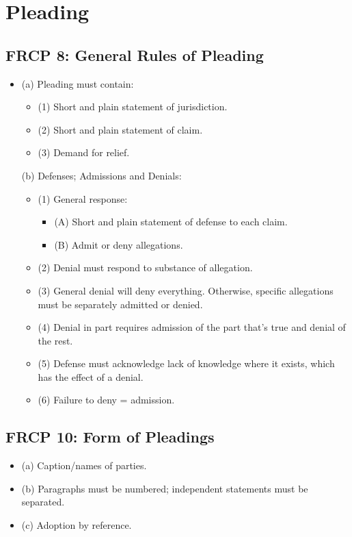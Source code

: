 \section{Pleading}

\subsection{FRCP 8: General Rules of Pleading}

\begin{itemize}
    \item (a) Pleading must contain:
    \begin{itemize}
        \item (1) Short and plain statement of jurisdiction.
        \item (2) Short and plain statement of claim.
        \item (3) Demand for relief.
    \end{itemize}
    (b) Defenses; Admissions and Denials:
    \begin{itemize}
        \item (1) General response:
        \begin{itemize}
            \item (A) Short and plain statement of defense to each claim.
            \item (B) Admit or deny allegations.
        \end{itemize}
        \item (2) Denial must respond to substance of allegation.
        \item (3) General denial will deny everything. Otherwise, specific 
        allegations must be separately admitted or denied.
        \item (4) Denial in part requires admission of the part that's true 
        and denial of the rest.
        \item (5) Defense must acknowledge lack of knowledge where it exists, 
        which has the effect of a denial.
        \item (6) Failure to deny = admission.
    \end{itemize}
\end{itemize}

\subsection{FRCP 10: Form of Pleadings}

\begin{itemize}
    \item (a) Caption/names of parties.
    \item (b) Paragraphs must be numbered; independent statements must be 
    separated.
    \item (c) Adoption by reference.
\end{itemize}

